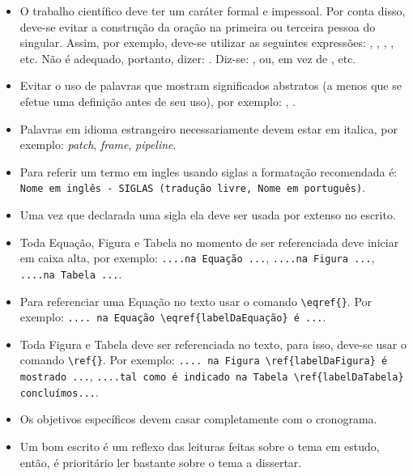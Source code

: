 \begin{itemize}
\item 
{}  O trabalho científico deve ter um caráter formal e impessoal. Por conta disso, deve-se evitar a construção da oração na primeira ou terceira pessoa do singular. Assim, por exemplo, deve-se utilizar as seguintes expressões: , , , ,  etc. Não é adequado, portanto, dizer: . Diz-se: , ou, em vez de ,  etc.
\item 
{} 
Evitar o uso de palavras que mostram significados abstratos (a menos que se efetue uma definição antes de seu uso), por exemplo: , .
\item 
{} Palavras em idioma estrangeiro necessariamente devem estar em italica, por exemplo: \textit{patch}, \textit{frame}, \textit{pipeline}.
\item 
{} Para referir um termo em ingles usando siglas a formatação recomendada é: \verb|Nome em inglês - SIGLAS (tradução livre, Nome em português)|.
\item 
{} Uma vez que declarada uma sigla ela deve ser usada por extenso no escrito.
\item 
{} Toda Equação, Figura e Tabela no momento de ser referenciada deve iniciar em caixa alta, por exemplo: \verb|....na Equação ...|, \verb|....na Figura ...|, \verb|....na Tabela ...|. 
\item 
{} Para referenciar uma Equação no texto usar o comando \verb|\eqref{}|. Por exemplo: 
\verb|.... na Equação \eqref{labelDaEquação} é ...|. 
\item 
{} Toda Figura e Tabela deve ser referenciada no texto, para isso, deve-se usar o comando \verb|\ref{}|. Por exemplo: 
\verb|.... na Figura \ref{labelDaFigura} é mostrado ...|,  
\verb|....tal como é indicado na Tabela \ref{labelDaTabela} concluímos...|. 
\item 
{} Os objetivos específicos devem casar completamente com o cronograma.
\item 
{} Um bom escrito é um reflexo das leituras feitas sobre o tema em estudo, então, é prioritário ler bastante sobre o tema a dissertar.
\end{itemize}

